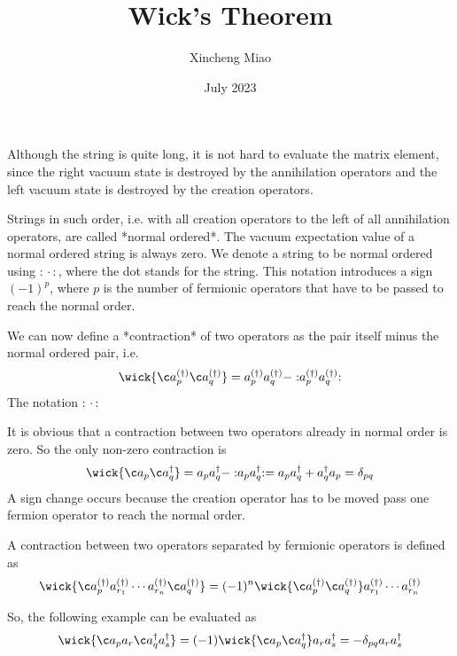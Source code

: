 \documentclass{article}
\title{Wick's Theorem}
\author{Xincheng Miao}
\date{July 2023}
\begin{document}
\maketitle

Although the string is quite long, it is not hard to evaluate the matrix
element, since the right vacuum state is destroyed by the annihilation
operators and the left vacuum state is destroyed by the creation operators.

Strings in such order, i.e. with all creation operators to the left of
all annihilation operators, are called *normal ordered*. The vacuum
expectation value of a normal ordered string is always zero. We denote
a string to be normal ordered using $:\mathrel{\cdot}:$, where the dot
stands for the string. This notation introduces a sign $(-1)^p$, where $p$ is
the number of fermionic operators that have to be passed to reach the
normal order.

We can now define a *contraction* of two operators as the pair itself minus
the normal ordered pair, i.e.
$$
	\wick{\c a_p^{(\dagger)} \c a_q^{(\dagger)}} = a_p^{(\dagger)} a_q^{(\dagger)} - :\mathrel{a_p^{(\dagger)} a_q^{(\dagger)}}:
$$
The notation $:\mathrel{\cdot}:$

It is obvious that a contraction between two operators already in normal
order is zero. So the only non-zero contraction is
$$
	\wick{\c a_p \c a_q^\dagger} = a_p a_q^\dagger - :\mathrel{a_p a_q^\dagger}: =
	a_p a_q^\dagger + a_q^{\dagger} a_p = \delta_{pq}
$$
A sign change occurs because the creation operator has to be moved pass one
fermion operator to reach the normal order.

A contraction between two operators separated by fermionic operators is
defined as
$$
	\wick{\c a_p^{(\dagger)} a_{r_1}^{(\dagger)} \cdots a_{r_n}^{(\dagger)} \c a_q^{(\dagger)}} =
	(-1)^n \wick{\c a_p^{(\dagger)} \c a_q^{(\dagger)}} a_{r_1}^{(\dagger)} \cdots a_{r_n}^{(\dagger)}
$$

So, the following example can be evaluated as
$$
	\wick{\c a_p a_r \c a_q^\dagger a_s^\dagger} =
	(-1) \wick{\c a_p \c a_q^\dagger} a_r a_s^\dagger =
	-\delta_{pq} a_r a_s^\dagger
$$
\end{document}
